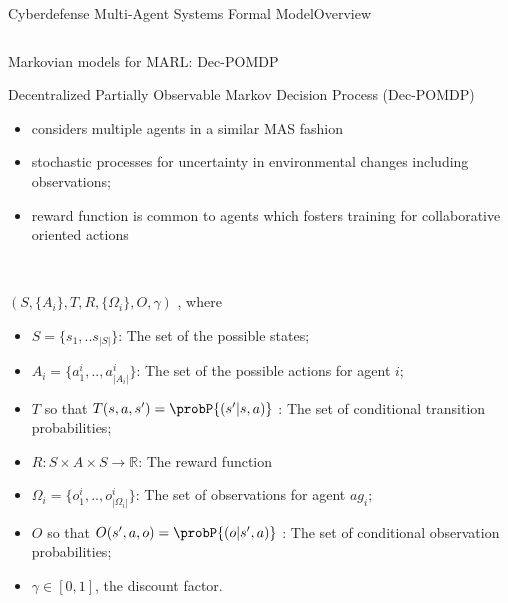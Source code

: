 \begin{frame}{Cyberdefense Multi-Agent Systems Formal Model}{Overview}
\begin{columns}
\begin{column}{0.65\textwidth}
            \begin{center}
                \begin{minipage}{0.95\linewidth}
                    \centering
                    \begin{block}{Markovian models for MARL: Dec-POMDP}
                        {\small
                            Decentralized Partially Observable Markov Decision Process (Dec-POMDP)~\cite{Oliehoek2016}
                            \begin{itemize}
                                \item considers multiple agents in a similar MAS fashion
                                \item stochastic processes for uncertainty in environmental changes including observations;
                                \item reward function is common to agents which fosters training for collaborative oriented actions~\cite{Beynier2013}
                            \end{itemize}
                        }
                        \

                        { \scriptsize

                        $(S,\{A_i\},T,R,\{\Omega_i\},O,\gamma)$ , where
                        \begin{itemize}
                            \item $S = \{s_1, ..s_{|S|}\}$: The set of the possible states;
                            \item $A_{i} = \{a_{1}^{i},..,a_{|A_{i}|}^{i}\}$: The set of the possible actions for agent $i$;
                            \item $T$ so that $T(s,a,s') = \probP{(s'|s,a)}$ : The set of conditional transition probabilities;
                            \item $R: S \times A \times S \rightarrow \mathbb{R}$: The reward function
                            \item $\Omega_{i} = \{o_{1}^{i},..,o_{|\Omega_{i}|}^{i}\}$: The set of observations for agent $ag_i$;
                            \item $O$ so that $O(s',a,o) = \probP{(o|s',a)}$ : The set of conditional observation probabilities;
                            \item $\gamma \in [0,1]$, the discount factor.
                        \end{itemize}

                        }

                    \end{block}

                \end{minipage}
            \end{center}

        \end{column}

    \end{columns}


\end{frame}

